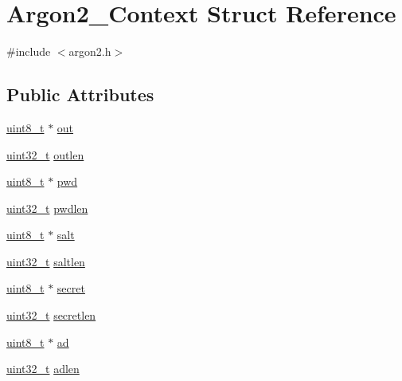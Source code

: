 \hypertarget{struct_argon2___context}{}\section{Argon2\+\_\+\+Context Struct Reference}
\label{struct_argon2___context}


{\ttfamily \#include $<$argon2.\+h$>$}

\subsection*{Public Attributes}
\begin{DoxyCompactItemize}
\item 
\hyperlink{stdint_8h_aba7bc1797add20fe3efdf37ced1182c5}{uint8\+\_\+t} $\ast$ \hyperlink{struct_argon2___context_a53bc334f5ca86d2ff639abddb9b08177}{out}
\item 
\hyperlink{stdint_8h_a435d1572bf3f880d55459d9805097f62}{uint32\+\_\+t} \hyperlink{struct_argon2___context_a11cb0932b2a6fd6fa0e6f5f5148f3ba9}{outlen}
\item 
\hyperlink{stdint_8h_aba7bc1797add20fe3efdf37ced1182c5}{uint8\+\_\+t} $\ast$ \hyperlink{struct_argon2___context_a0ddb2c07c361a668e1f925f9a2eb6523}{pwd}
\item 
\hyperlink{stdint_8h_a435d1572bf3f880d55459d9805097f62}{uint32\+\_\+t} \hyperlink{struct_argon2___context_a734b6a24aa48806715a5b81d7dfa98c3}{pwdlen}
\item 
\hyperlink{stdint_8h_aba7bc1797add20fe3efdf37ced1182c5}{uint8\+\_\+t} $\ast$ \hyperlink{struct_argon2___context_a36bfd9d93195daafa0d7e4afdbbee1dc}{salt}
\item 
\hyperlink{stdint_8h_a435d1572bf3f880d55459d9805097f62}{uint32\+\_\+t} \hyperlink{struct_argon2___context_a1f151741022a0b25c66c704408522cca}{saltlen}
\item 
\hyperlink{stdint_8h_aba7bc1797add20fe3efdf37ced1182c5}{uint8\+\_\+t} $\ast$ \hyperlink{struct_argon2___context_a7c35fd8bd296f776a9db6278c9bdacb6}{secret}
\item 
\hyperlink{stdint_8h_a435d1572bf3f880d55459d9805097f62}{uint32\+\_\+t} \hyperlink{struct_argon2___context_a9530abd766c77aba4e841445e5c70a08}{secretlen}
\item 
\hyperlink{stdint_8h_aba7bc1797add20fe3efdf37ced1182c5}{uint8\+\_\+t} $\ast$ \hyperlink{struct_argon2___context_a20329e319449d710c4f5bf591690b4c4}{ad}
\item 
\hyperlink{stdint_8h_a435d1572bf3f880d55459d9805097f62}{uint32\+\_\+t} \hyperlink{struct_argon2___context_a27f944c49530b5a43d754c1a5ec30918}{adlen}

\end{DoxyCompactItemize}
